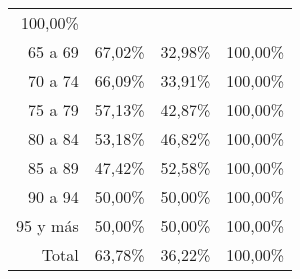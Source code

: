 \begin{tabular}{llll}
  \multicolumn{1}{r}{100,00\%} \\
\multicolumn{1}{r}{65 a 69\hspace{1em}} &
  \multicolumn{1}{|r}{67,02\%} &
  \multicolumn{1}{r}{32,98\%} &
  \multicolumn{1}{r}{100,00\%} \\
\multicolumn{1}{r}{70 a 74\hspace{1em}} &
  \multicolumn{1}{|r}{66,09\%} &
  \multicolumn{1}{r}{33,91\%} &
  \multicolumn{1}{r}{100,00\%} \\
\multicolumn{1}{r}{75 a 79\hspace{1em}} &
  \multicolumn{1}{|r}{57,13\%} &
  \multicolumn{1}{r}{42,87\%} &
  \multicolumn{1}{r}{100,00\%} \\
\multicolumn{1}{r}{80 a 84\hspace{1em}} &
  \multicolumn{1}{|r}{53,18\%} &
  \multicolumn{1}{r}{46,82\%} &
  \multicolumn{1}{r}{100,00\%} \\
\multicolumn{1}{r}{85 a 89\hspace{1em}} &
  \multicolumn{1}{|r}{47,42\%} &
  \multicolumn{1}{r}{52,58\%} &
  \multicolumn{1}{r}{100,00\%} \\
\multicolumn{1}{r}{90 a 94\hspace{1em}} &
  \multicolumn{1}{|r}{50,00\%} &
  \multicolumn{1}{r}{50,00\%} &
  \multicolumn{1}{r}{100,00\%} \\
\multicolumn{1}{r}{95 y más\hspace{1em}} &
  \multicolumn{1}{|r}{50,00\%} &
  \multicolumn{1}{r}{50,00\%} &
  \multicolumn{1}{r}{100,00\%} \\
\multicolumn{1}{r}{Total\hspace{1em}} &
  \multicolumn{1}{|r}{63,78\%} &
  \multicolumn{1}{r}{36,22\%} &
  \multicolumn{1}{r}{100,00\%} \\
\cline{1-4}
\end{tabular}
